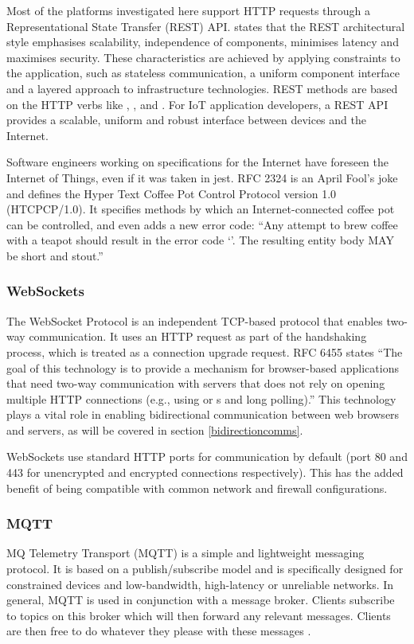         Most of the platforms investigated here support HTTP requests through a Representational State Transfer (REST) API. \citet{rest:2000} states that the REST architectural style emphasises scalability, independence of components, minimises latency and maximises security. These characteristics are achieved by applying constraints to the application, such as stateless communication, a uniform component interface and a layered approach to infrastructure technologies. REST methods are based on the HTTP verbs like , ,  and . For IoT application developers, a REST API provides a scalable, uniform and robust interface between devices and the Internet.

        Software engineers working on specifications for the Internet have foreseen the Internet of Things, even if it was taken in jest. RFC 2324 \citep{rfc2324} is an April Fool's joke and defines the Hyper Text Coffee Pot Control Protocol version 1.0 (HTCPCP/1.0). It specifies methods by which an Internet-connected coffee pot can be controlled, and even adds a new error code: ``Any attempt to brew coffee with a teapot should result in the error code `'. The resulting entity body MAY be short and stout.''

      \subsubsection{WebSockets}
        The WebSocket Protocol is an independent TCP-based protocol that enables two-way communication. It uses an HTTP request as part of the handshaking process, which is treated as a connection upgrade request. RFC 6455 \citep{rfc6455} states ``The goal of this technology is to provide a mechanism for browser-based applications that need two-way communication with servers that does not rely on opening multiple HTTP connections (e.g., using  or s and long polling).'' This technology plays a vital role in enabling bidirectional communication between web browsers and servers, as will be covered in section \ref{bidirectioncomms}.

        WebSockets use standard HTTP ports for communication by default (port 80 and 443 for unencrypted and encrypted connections respectively). This has the added benefit of being compatible with common network and firewall configurations.

      \subsubsection{MQTT}
        \label{section:mqtt}
        MQ Telemetry Transport (MQTT) is a simple and lightweight messaging protocol. It is based on a publish/subscribe model and is specifically designed for constrained devices and low-bandwidth, high-latency or unreliable networks. In general, MQTT is used in conjunction with a message broker. Clients subscribe to topics on this broker which will then forward any relevant messages. Clients are then free to do whatever they please with these messages \citep{mqtt:2015}.

